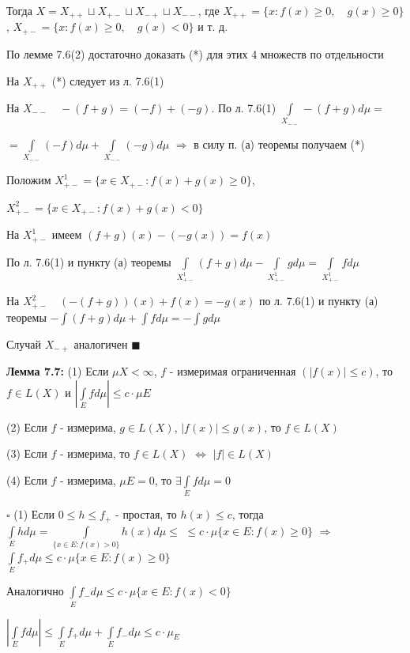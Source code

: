 \documentclass[a4paper]{report}
\begin{document}
Тогда $X=X_{++}\sqcup X_{+-}\sqcup X_{-+}\sqcup X_{--}$, где $X_{++}=\{x\colon f(x)\ge0,\quad g(x)\ge0\}$, $X_{+-}=\{x\colon f(x)\ge0,\quad g(x)<0\}$ и т. д.

По лемме 7.6(2) достаточно доказать (*) для этих 4 множеств по отдельности

На $X_{++}$ (*) следует из л. 7.6(1)

На $X_{--}\quad-(f+g)=(-f)+(-g)$. По л. 7.6(1) $\displaystyle\int\limits_{X_{--}}-(f+g)d\mu=$

\noindent $=\displaystyle\int\limits_{X_{--}}(-f)d\mu+\displaystyle\int\limits_{X_{--}}(-g)d\mu$ $\Rightarrow$ в силу п. (а) теоремы получаем (*)

Положим $X_{+-}^1=\{x\in X_{+-}\colon f(x)+g(x)\ge0\}$,

$X_{+-}^2=\{x\in X_{+-}\colon f(x)+g(x)<0\}$

На $X_{+-}^1$ имеем $(f+g)(x)-(-g(x))=f(x)$

По л. 7.6(1) и пункту (а) теоремы $\displaystyle\int\limits_{X_{+-}^1}(f+g)d\mu-\displaystyle\int\limits_{X_{+-}^1}gd\mu=\displaystyle\int\limits_{X_{+-}^1}fd\mu$

На $X_{+-}^2\quad(-(f+g))(x)+f(x)=-g(x)$ по л. 7.6(1) и пункту (а) теоремы $-\displaystyle\int(f+g)d\mu+\displaystyle\int fd\mu=-\displaystyle\int gd\mu$

Случай $X_{-+}$ аналогичен $\blacksquare$
\bigskip

\noindent\textbf{Лемма 7.7:} (1) Если $\mu X<\infty$, $f$ - измеримая ограниченная $(|f(x)|\le c)$, то $f\in L(X)$ и $\left|\displaystyle\int\limits_E fd\mu\right|\le c\cdot\mu E$

(2) Если $f$ - измерима, $g\in L(X)$, $|f(x)|\le g(x)$, то $f\in L(X)$

(3) Если $f$ - измерима, то $f\in L(X)$ $\Leftrightarrow$ $|f|\in L(X)$

(4) Если $f$ - измерима, $\mu E=0$, то $\exists\displaystyle\int\limits_E fd\mu=0$

\noindent $\square$ (1) Если $0\le h\le f_+$ - простая, то $h(x)\le c$, тогда $\displaystyle\int\limits_E hd\mu=\displaystyle\int\limits_{\{x\in E\colon f(x)>0\}} h(x) d\mu\le$
\noindent $\le c\cdot\mu\{x\in E\colon f(x)\ge0\}$ $\Rightarrow$ $\displaystyle\int\limits_E f_+d\mu\le c\cdot\mu\{x\in E\colon f(x)\ge0\}$

Аналогично $\displaystyle\int\limits_E f_-d\mu\le c\cdot\mu\{x\in E\colon f(x)<0\}$

$\left|\displaystyle\int\limits_E fd\mu\right|\le\displaystyle\int\limits_E f_+d\mu+\displaystyle\int\limits_E f_-d\mu\le c\cdot\mu_E$
\end{document}
